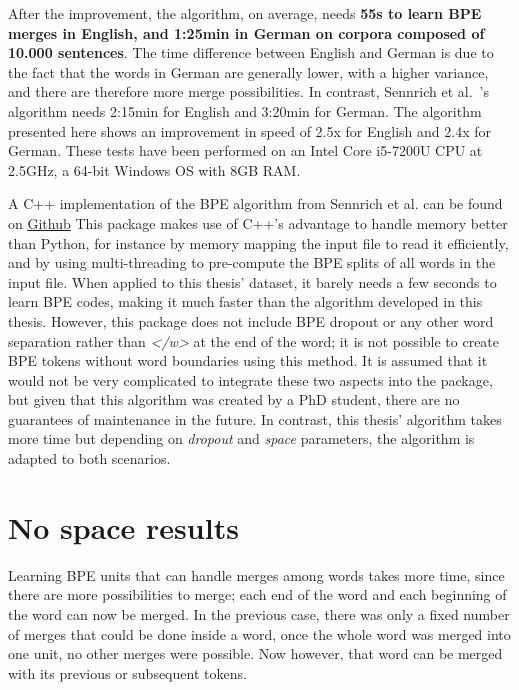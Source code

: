 After the improvement, the algorithm, on average, needs \textbf{55s to learn BPE merges in English, and 1:25min in German on corpora composed of 10.000 sentences}. The time difference between English and German is due to the fact that the words in German are generally lower, with a higher variance, and there are therefore more merge possibilities. In contrast, Sennrich et al.~\cite{sennrich2015neural}'s algorithm needs 2:15min for English and 3:20min for German. The algorithm presented here shows an improvement in speed of 2.5x for English and 2.4x for German. These tests have been performed on an Intel Core i5-7200U CPU at 2.5GHz, a 64-bit Windows OS with 8GB RAM.

A C++ implementation of the BPE algorithm from Sennrich et al. can be found on \href{https://github.com/glample/fastBPE}{Github} This package makes use of C++'s advantage to handle memory better than Python, for instance by memory mapping the input file to read it efficiently, and by using multi-threading to pre-compute the BPE splits of all words in the input file. When applied to this thesis' dataset, it barely needs a few seconds to learn BPE codes, making it much faster than the algorithm developed in this thesis. However, this package does not include BPE dropout or any other word separation rather than \emph{</w>} at the end of the word; it is not possible to create BPE tokens without word boundaries using this method. It is assumed that it would not be very complicated to integrate these two aspects into the package, but given that this algorithm was created by a PhD student, there are no guarantees of maintenance in the future. In contrast, this thesis' algorithm takes more time but depending on \emph{dropout} and \emph{space} parameters, the algorithm is adapted to both scenarios.

\section{No space results}

Learning BPE units that can handle merges among words takes more time, since there are more possibilities to merge; each end of the word and each beginning of the word can now be merged. In the previous case, there was only a fixed number of merges that could be done inside a word, once the whole word was merged into one unit, no other merges were possible. Now however, that word can be merged with its previous or subsequent tokens.

